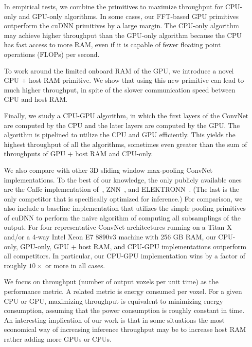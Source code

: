 \documentclass[conference]{./IEEEtran/IEEEtran}
\begin{document}
  In empirical tests, we combine the primitives to maximize throughput
  for CPU-only and GPU-only algorithms. In some cases, our FFT-based
  GPU primitives outperform the cuDNN primitives by a large margin.
  The CPU-only algorithm may achieve higher throughput than the
  GPU-only algorithm because the CPU has fast access to more RAM, even
  if it is capable of fewer floating point operations (FLOPs) per
  second.

  To work around the limited onboard RAM of the GPU, we introduce a
  novel GPU + host RAM primitive.  We show that using this new
  primitive can lead to much higher throughput, in spite of the slower
  communication speed between GPU and host RAM.

  Finally, we study a CPU-GPU algorithm, in which the first layers of
  the ConvNet are computed by the CPU and the later layers are
  computed by the GPU.  The algorithm is pipelined to utilize the CPU
  and GPU efficiently.  This yields the highest throughput of all the
  algorithms, sometimes even greater than the sum of throughputs of
  GPU + host RAM and CPU-only.

  We also compare with other 3D sliding window max-pooling ConvNet
  implementations.  To the best of our knowledge, the only publicly
  available ones are the Caffe implementation
  of~\cite{tschopp2015efficient}, ZNN~\cite{zlateski2015znn}, and
  ELEKTRONN~\cite{ELEKTRONN2015}.  (The last is the only competitor
  that is specifically optimized for inference.) For comparison, we
  also include a baseline implementation that utilizes the simple
  pooling primitives of cuDNN to perform the naive algorithm of
  computing all subsamplings of the output.  For four representative
  ConvNet architectures running on a Titan X and/or a 4-way Intel Xeon
  E7 8890v3 machine with 256 GB RAM, our CPU-only, GPU-only, GPU +
  host RAM, and CPU-GPU implementations outperform all competitors.
  In particular, our CPU-GPU implementation wins by a factor of
  roughly $10\times$ or more in all cases.

  We focus on throughput (number of output voxels per unit time) as
  the performance metric.  A related metric is energy consumed per
  voxel.  For a given CPU or GPU, maximizing throughput is equivalent
  to minimizing energy consumption, assuming that the power
  consumption is roughly constant in time.  An interesting implication
  of our work is that in some situations the most economical way of
  increasing inference throughput may be to increase host RAM rather
  adding more GPUs or CPUs.
\end{document}
